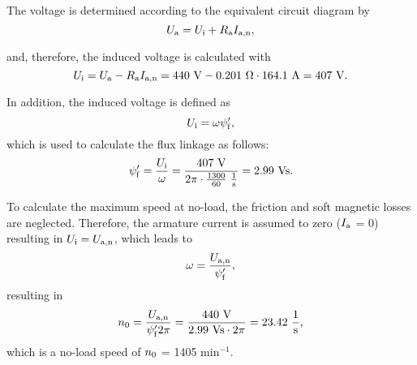 \begin{solutionblock}
    The voltage is determined according to the equivalent circuit diagram by
    \begin{equation}
        \Ua = \Ui + \Ra I_{\mathrm{a,n}},
    \end{equation}

    and, therefore, the induced voltage is calculated with
    \begin{equation}
        \Ui = \Ua - \Ra I_{\mathrm{a,n}}
        = 440 \ \si{V} - 0.201 \ \si{\Omega} \cdot 164.1 \ \si{A}
        = 407 \ \si{V}.
    \end{equation}

    In addition, the induced voltage is defined as
    \begin{equation}
        \Ui = \omega \psi_\mathrm{f}',
    \end{equation}
    which is used to calculate the flux linkage as follows:
    \begin{equation}
        \psi_{\mathrm{f}}' = \frac{\Ui}{\omega}
        = \frac{407 \ \si{V}}{2\pi \cdot \frac{1300}{60} \ \si{\frac{1}{s}}}
        = 2.99 \ \si{Vs}. 
    \end{equation}

    To calculate the maximum speed at no-load, the friction and soft magnetic losses are neglected. Therefore, the armature current is assumed to zero ($\Ia$ = 0) resulting in $U_{\mathrm{i}} = \Uan$, which leads to
    \begin{equation}
        \omega = \frac{\Uan}{\psi_{\mathrm{f}}'},
    \end{equation}
    resulting in
    \begin{equation}
        \nO = \frac{\Uan}{\psi_{\mathrm{f}}' 2 \pi} = \frac{440 \ \si{V}}{2.99 \ \si{Vs} \cdot 2 \pi}
        = 23.42 \ \si{\frac{1}{s}},
    \end{equation}
    which is a no-load speed of $\nO$ = 1405 $\mathrm{min^{-1}}$.

       
\end{solutionblock}



